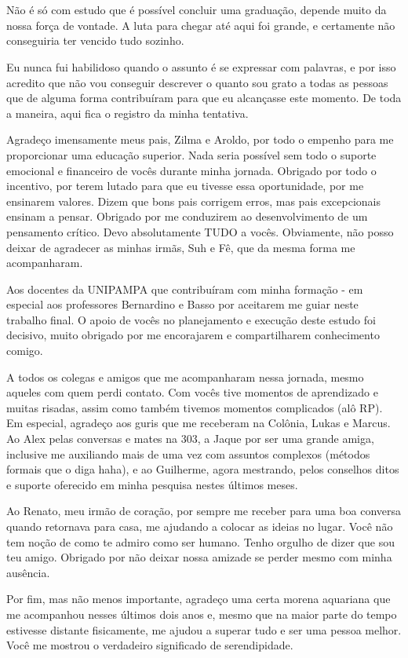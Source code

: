 \begin{agradecimentos}
\\~\\

Não é só com estudo que é possível concluir uma graduação, depende muito da nossa força de vontade.
A luta para chegar até aqui foi grande, e certamente não conseguiria ter vencido tudo sozinho.

Eu nunca fui habilidoso quando o assunto é se expressar com palavras, e por isso acredito que não vou conseguir descrever o quanto sou grato a todas as pessoas que de alguma forma contribuíram para que eu alcançasse este momento. 
De toda a maneira, aqui fica o registro da minha tentativa.

Agradeço imensamente meus pais, Zilma e Aroldo, por todo o empenho para me proporcionar uma educação superior. Nada seria possível sem todo o suporte emocional e financeiro de vocês durante minha jornada. 
Obrigado por todo o incentivo, por terem lutado para que eu tivesse essa oportunidade, por me ensinarem valores. 
Dizem que bons pais corrigem erros, mas pais excepcionais ensinam a pensar.
Obrigado por me conduzirem ao desenvolvimento de um pensamento crítico. 
Devo absolutamente TUDO a vocês. Obviamente, não posso deixar de agradecer as minhas irmãs, Suh e Fê, que da mesma forma me acompanharam.

Aos docentes da UNIPAMPA que contribuíram com minha formação - em especial aos professores Bernardino e Basso por aceitarem me guiar neste trabalho final. 
O apoio de vocês no planejamento e execução deste estudo foi decisivo, muito obrigado por me encorajarem e compartilharem conhecimento comigo.

A todos os colegas e amigos que me acompanharam nessa jornada, mesmo aqueles com quem perdi contato. 
Com vocês tive momentos de aprendizado e muitas risadas, assim como também tivemos momentos complicados (alô RP). Em especial, agradeço aos guris que me receberam na Colônia, Lukas e Marcus. 
Ao Alex pelas conversas e mates na 303, a Jaque por ser uma grande amiga, inclusive me auxiliando mais de uma vez com assuntos complexos (métodos formais que o diga haha), e ao Guilherme, agora mestrando, pelos conselhos ditos e suporte oferecido em minha pesquisa nestes últimos meses.

Ao Renato, meu irmão de coração, por sempre me receber para uma boa conversa quando retornava para casa, me ajudando a colocar as ideias no lugar.
Você não tem noção de como te admiro como ser humano. 
Tenho orgulho de dizer que sou teu amigo.
Obrigado por não deixar nossa amizade se perder mesmo com minha ausência. 

Por fim, mas não menos importante, agradeço uma certa morena aquariana que me acompanhou nesses últimos dois anos e, mesmo que na maior parte do tempo estivesse distante fisicamente, me ajudou a superar tudo e ser uma pessoa melhor. Você me mostrou o verdadeiro significado de serendipidade. 

\end{agradecimentos}